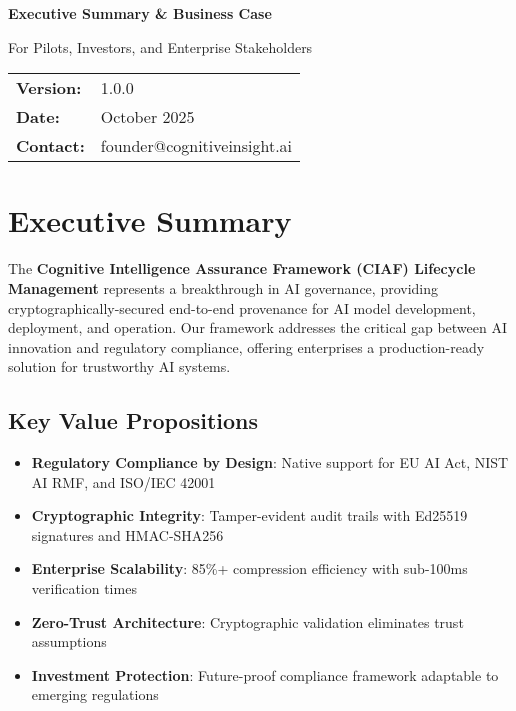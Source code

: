 \documentclass[12pt,a4paper]{article}
\begin{document}
\begin{titlepage}

\vspace{2cm}

{\large\bfseries Executive Summary \& Business Case}

\vspace{1cm}
{\large For Pilots, Investors, and Enterprise Stakeholders}

\vfill

\begin{tabular}{ll}
\textbf{Version:} & 1.0.0 \\
\textbf{Date:} & October 2025 \\
\textbf{Contact:} & founder@cognitiveinsight.ai \\
\end{tabular}

\end{titlepage}

\tableofcontents
\newpage

\section{Executive Summary}

\begin{executivebox}
The \textbf{Cognitive Intelligence Assurance Framework (CIAF) Lifecycle Management} represents a breakthrough in AI governance, providing cryptographically-secured end-to-end provenance for AI model development, deployment, and operation. Our framework addresses the critical gap between AI innovation and regulatory compliance, offering enterprises a production-ready solution for trustworthy AI systems.
\end{executivebox}

\subsection{Key Value Propositions}

\begin{valuebox}
\begin{itemize}[leftmargin=*]
    \item \textbf{Regulatory Compliance by Design}: Native support for EU AI Act, NIST AI RMF, and ISO/IEC 42001
    \item \textbf{Cryptographic Integrity}: Tamper-evident audit trails with Ed25519 signatures and HMAC-SHA256
    \item \textbf{Enterprise Scalability}: 85\%+ compression efficiency with sub-100ms verification times
    \item \textbf{Zero-Trust Architecture}: Cryptographic validation eliminates trust assumptions
    \item \textbf{Investment Protection}: Future-proof compliance framework adaptable to emerging regulations
\end{itemize}
\end{valuebox}
\end{document}
